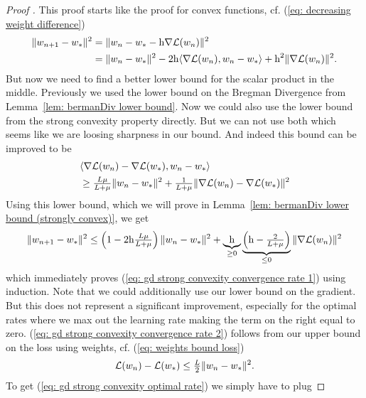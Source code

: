 \begin{proof}[Proof {\parencite[Theorem 2.1.15]{nesterovLecturesConvexOptimization2018}}]
	This proof starts like the proof for convex functions, cf. (\ref{eq:
	decreasing weight difference})
 \begin{align*}
		\|w_{n+1} - w_*\|^2
		&= \| w_n -w_* - \text{h}\nabla\mathcal{L}(w_n)\|^2\\
		&= \| w_n - w_*\|^2
		- 2\text{h}\langle \nabla\mathcal{L}(w_n), w_n - w_*\rangle
		+ \text{h}^2 \| \nabla\mathcal{L}(w_n)\|^2.
	\end{align*}
	But now we need to find a better lower bound for the scalar product in the
	middle. Previously we used the lower bound on the Bregman Divergence from
	Lemma~\ref{lem: bermanDiv lower bound}. Now we could also use the lower bound
	from the strong convexity property directly. But we can not use both which
	seems like we are loosing sharpness in our bound. And indeed this bound can
	be improved to be
 	\begin{align*}
		&\langle \nabla\mathcal{L}(w_n) -\nabla\mathcal{L}(w_*), w_n - w_*\rangle	\\
		&\ge \tfrac{L\mu}{L+\mu}\|w_n - w_*\|^2
		+ \tfrac{1}{L+\mu}
		\|\nabla\mathcal{L}(w_n) - \nabla\mathcal{L}(w_*)\|^2
	\end{align*}
	Using this lower bound, which we will prove in Lemma~\ref{lem: bermanDiv
	lower bound (strongly convex)}, we get
 \begin{align*}
		\|w_{n+1} - w_*\|^2
		\le \left(1- 2\text{h} \tfrac{L\mu}{L+\mu}\right)
		\|w_n - w_*\|^2
		+ \underbrace{\text{h}}_{\ge 0}
		\underbrace{\left(\text{h}-\tfrac{2}{L+\mu}\right)}_{\le0}
		\|\nabla\mathcal{L}(w_n)\|^2
	\end{align*}
	which immediately proves (\ref{eq: gd strong convexity convergence rate
	1}) using induction. Note that we could additionally use our lower bound on the
	gradient. But this does not represent a significant improvement,
	especially for the optimal rates where we max out the learning rate making
	the term on the right equal to zero. (\ref{eq: gd strong convexity
	convergence rate 2}) follows from our upper bound on the loss using weights,
	cf. (\ref{eq: weights bound loss}) 
	\begin{align*}
		\mathcal{L}(w_n) - \mathcal{L}(w_*)
		\le \tfrac{L}{2} \| w_n - w_*\|^2.
	\end{align*}
	To get (\ref{eq: gd strong convexity optimal rate}) we simply have to plug

\end{proof}
